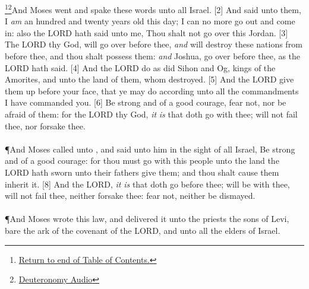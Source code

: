 \footnote{\textcolor[cmyk]{0.99998,1,0,0}{\hyperlink{TOC}{Return to end of Table of Contents.}}}\footnote{\href{https://www.audioverse.org/english/audiobibles/books/ENGKJV/O/Deut/1}{\textcolor[cmyk]{0.99998,1,0,0}{Deuteronomy Audio}}}\textcolor[cmyk]{0.99998,1,0,0}{And Moses went and spake these words unto all Israel.}
[2] \textcolor[cmyk]{0.99998,1,0,0}{And  said unto them, I \emph{am} an hundred and twenty years old this day; I can no more go out and come in: also the LORD hath said unto me, Thou shalt not go over this Jordan.}
[3] \textcolor[cmyk]{0.99998,1,0,0}{The LORD thy God,  will go over before thee, \emph{and}  will destroy these nations from before thee, and thou shalt possess them: \emph{and} Joshua,   go over before thee, as the LORD hath said.}
[4] \textcolor[cmyk]{0.99998,1,0,0}{And the LORD  do  as  did   Sihon and   Og, kings of the Amorites, and unto the land of them, whom  destroyed.}
[5] \textcolor[cmyk]{0.99998,1,0,0}{And the LORD  give them up before your face, that ye may do  according unto all the commandments    I have commanded you.}
[6] \textcolor[cmyk]{0.99998,1,0,0}{Be strong and of a good courage, fear not, nor be afraid of them: for the LORD thy God,  \emph{it} \emph{is} that doth go with thee;  will not fail thee, nor forsake thee.}\\
\\
\P \textcolor[cmyk]{0.99998,1,0,0}{And Moses called unto , and said unto him in the sight of all Israel, Be strong and of a good courage: for thou must go with this people unto the land    the LORD hath sworn unto their fathers   give them; and thou shalt cause them   inherit it.}
[8] \textcolor[cmyk]{0.99998,1,0,0}{And the LORD,  \emph{it} \emph{is} that doth go before thee;  will be with thee,  will not fail thee, neither forsake thee: fear not, neither be dismayed.}\\
\\
\P \textcolor[cmyk]{0.99998,1,0,0}{And Moses wrote this law, and delivered it unto the priests the sons of Levi,    bare the ark of the covenant of the LORD, and unto all the elders of Israel.}
